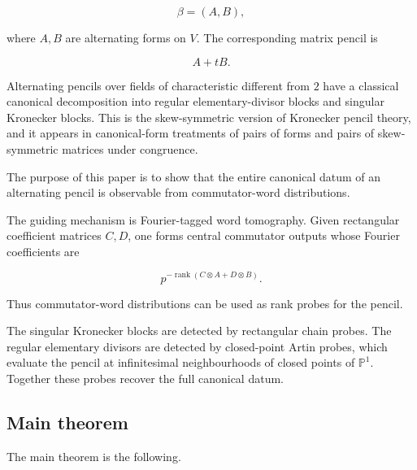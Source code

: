 \documentclass[11pt]{article}
\begin{document}
\[
\beta=(A,B),
\]

where $A,B$ are alternating forms on $V$. The corresponding matrix pencil is

\[
A+tB.
\]

Alternating pencils over fields of characteristic different from $2$ have a classical canonical decomposition into regular elementary-divisor blocks and singular Kronecker blocks. This is the skew-symmetric version of Kronecker pencil theory, and it appears in canonical-form treatments of pairs of forms and pairs of skew-symmetric matrices under congruence.

The purpose of this paper is to show that the entire canonical datum of an alternating pencil is observable from commutator-word distributions.

The guiding mechanism is Fourier-tagged word tomography. Given rectangular coefficient matrices $C,D$, one forms central commutator outputs whose Fourier coefficients are

\[
p^{-\operatorname{rank}(C\otimes A+D\otimes B)}.
\]

Thus commutator-word distributions can be used as rank probes for the pencil.

The singular Kronecker blocks are detected by rectangular chain probes. The regular elementary divisors are detected by closed-point Artin probes, which evaluate the pencil at infinitesimal neighbourhoods of closed points of $\mathbb P^1$. Together these probes recover the full canonical datum.

\subsection{Main theorem}

The main theorem is the following.
\end{document}
